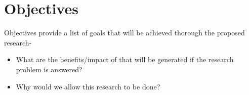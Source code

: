 \section*{Objectives}
\label{sec:objectives}

Objectives provide a list of goals that will be achieved thorough the proposed 
research-
\begin{itemize}
	\item What are the benefits/impact of that will be generated if the 
	research problem is answered?
	\item Why would we allow this research to be done?
\end{itemize}